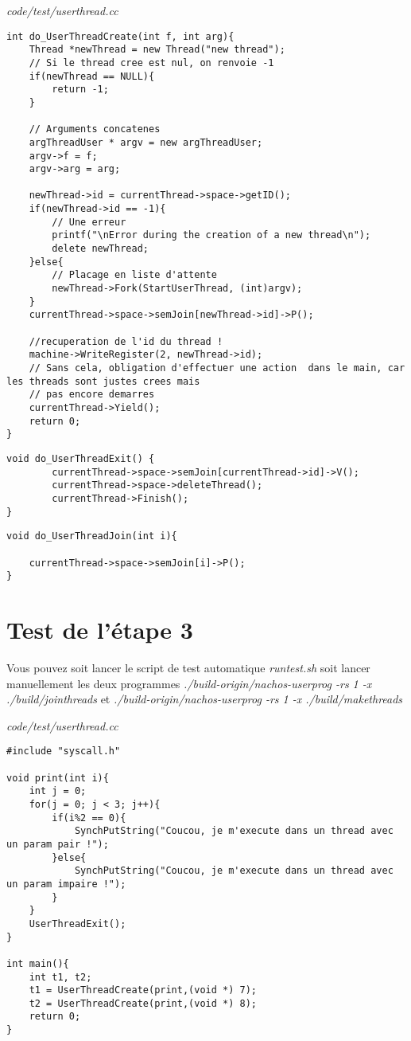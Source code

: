 \documentclass[a4paper,10pt]{article}
\begin{document}
\textit{code/test/userthread.cc}
\begin{lstlisting}
int do_UserThreadCreate(int f, int arg){
	Thread *newThread = new Thread("new thread");
	// Si le thread cree est nul, on renvoie -1
	if(newThread == NULL){
		return -1;
	}

	// Arguments concatenes
	argThreadUser * argv = new argThreadUser;
	argv->f = f;
	argv->arg = arg;

    newThread->id = currentThread->space->getID();
    if(newThread->id == -1){
        // Une erreur
        printf("\nError during the creation of a new thread\n");
        delete newThread;
    }else{
    	// Placage en liste d'attente
    	newThread->Fork(StartUserThread, (int)argv);
    }
    currentThread->space->semJoin[newThread->id]->P();

    //recuperation de l'id du thread !
    machine->WriteRegister(2, newThread->id);
    // Sans cela, obligation d'effectuer une action  dans le main, car les threads sont justes crees mais
    // pas encore demarres
    currentThread->Yield();
	return 0;
}
\end{lstlisting}

\begin{lstlisting}
void do_UserThreadExit() {
		currentThread->space->semJoin[currentThread->id]->V();
        currentThread->space->deleteThread();
        currentThread->Finish();
}
\end{lstlisting}

\begin{lstlisting}
void do_UserThreadJoin(int i){

    currentThread->space->semJoin[i]->P();
}
\end{lstlisting}

\section{Test de l'étape 3}

Vous pouvez soit lancer le script de test automatique \textit{runtest.sh} soit
lancer manuellement les deux programmes \textit{./build-origin/nachos-userprog
-rs 1 -x ./build/jointhreads} et \textit{./build-origin/nachos-userprog -rs 1 -x
./build/makethreads}

\textit{code/test/userthread.cc}
\begin{lstlisting}
#include "syscall.h"

void print(int i){
	int j = 0;
	for(j = 0; j < 3; j++){
		if(i%2 == 0){
			SynchPutString("Coucou, je m'execute dans un thread avec un param pair !");
		}else{
			SynchPutString("Coucou, je m'execute dans un thread avec un param impaire !");
		}
	}
	UserThreadExit();
}

int main(){
	int t1, t2;
	t1 = UserThreadCreate(print,(void *) 7);
	t2 = UserThreadCreate(print,(void *) 8);
	return 0;
}
\end{lstlisting}
\end{document}

